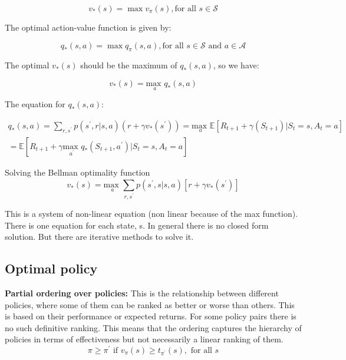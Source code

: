 	\begin{equation}
		v_*(s) = \max v_\pi(s), \text{for all } s \in \mathcal{S}
	\end{equation}

The optimal action-value function is given by:

	\begin{equation}
		q_*(s,a) = \max q_\pi(s,a), \text{for all } s \in \mathcal{S} \text{ and } a \in \mathcal{A}
	\end{equation}

The optimal $v_*(s)$ should be the maximum of $q_*(s,a)$, so we have:

	\begin{equation}
		v_*(s) = \underset{a}{\text{max }} q_*(s,a)
	\end{equation}

The equation for $q_*(s,a)$:


	\begin{equation}
	\begin{aligned}
		q_*(s,a) = \sum_{r, s^{\prime}}^{} p(s^{\prime},r |s,a)(r + \gamma v_*(s^{\prime})) = \underset{a}{\text{max }} \mathbb{E}[R_{t+1} + \gamma(S_{t+1}) | S_t = s, A_t = a] \\
		 = \mathbb{E}[R_{t+1} + \gamma \underset{a^{\prime}}{\text{max }} q_* (S_{t+1}, a^{\prime}) |S_t =s, A_t = a]
	\end{aligned}
	\end{equation}


\begin{wbox}{Solving the Bellman optimality function}
	\begin{equation}
		v_*(s) = \underset{a}{\text{max }} \sum_{r,s^{\prime}}^{} p(s^{\prime},s |s,a)[r+\gamma v_*(s^{\prime})]
	\end{equation}
\end{wbox}

This is a system of non-linear equation (non linear because of the max function). There is one equation for each state, s. In general there is no closed form solution. But there are iterative methods to solve it. 

\subsection*{Optimal policy}
\textbf{Partial ordering over policies: } This is the relationship between different policies, where some of them can be ranked as better or worse than others. This is based on their performance or expected returns. For some policy pairs there is no such definitive ranking. This means that the ordering captures the hierarchy of policies in terms of effectiveness  but not necessarily a linear ranking of them. 
	\begin{equation}
		\pi \ge \pi^{\prime} \text{ if } v_\pi(s) \ge t_{\pi^{\prime}}(s), \text{ for all }s
	\end{equation}

